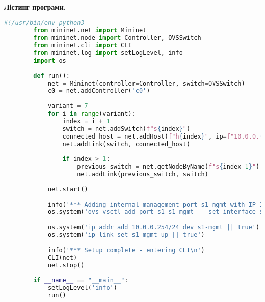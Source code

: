 \documentclass[14pt, a4paper]{extreport}
\begin{document}
	\pagebreak
	
	\begin{center}
		\textbf{Лістинг програми.}
	\end{center}
	
	\begin{lstlisting}[language=Python]
		#!/usr/bin/env python3
		from mininet.net import Mininet
		from mininet.node import Controller, OVSSwitch
		from mininet.cli import CLI
		from mininet.log import setLogLevel, info
		import os
		
		def run():
			net = Mininet(controller=Controller, switch=OVSSwitch)
			c0 = net.addController('c0')
		
			variant = 7
			for i in range(variant):
				index = i + 1
				switch = net.addSwitch(f"s{index}")
				connected_host = net.addHost(f"h{index}", ip=f"10.0.0.{index}/24")
				net.addLink(switch, connected_host)
		
				if index > 1:
					previous_switch = net.getNodeByName(f"s{index-1}")
					net.addLink(previous_switch, switch)
		
			net.start()
		
			info('*** Adding internal management port s1-mgmt with IP 10.0.0.254/24\n')
			os.system('ovs-vsctl add-port s1 s1-mgmt -- set interface s1-mgmt type=internal')
		
			os.system('ip addr add 10.0.0.254/24 dev s1-mgmt || true')
			os.system('ip link set s1-mgmt up || true')
		
			info('*** Setup complete - entering CLI\n')
			CLI(net)
			net.stop()
		
		if __name__ == "__main__":
			setLogLevel('info')
			run()
	\end{lstlisting}
		
\end{document}
